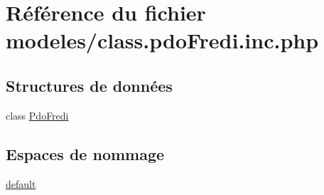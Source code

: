 \hypertarget{class_8pdo_fredi_8inc_8php}{}\section{Référence du fichier modeles/class.pdo\+Fredi.\+inc.\+php}
\label{class_8pdo_fredi_8inc_8php}
\subsection*{Structures de données}
\begin{DoxyCompactItemize}
\item 
class \hyperlink{class_pdo_fredi}{Pdo\+Fredi}
\end{DoxyCompactItemize}
\subsection*{Espaces de nommage}
\begin{DoxyCompactItemize}
\item 
 \hyperlink{namespacedefault}{default}
\end{DoxyCompactItemize}
